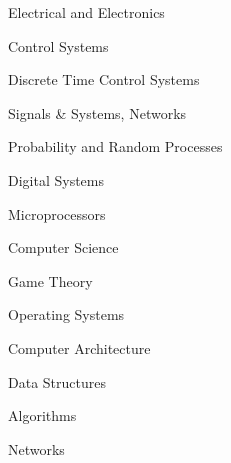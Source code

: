 \begin{courseentries}

  \courseentry
    {Electrical and Electronics} %
    {    
    \begin{cvitems} %
        \item {Control Systems}
        \item {Discrete Time Control Systems}
    \end{cvitems}
      }
    {    
    \begin{cvitems} %
        \item {Signals \& Systems, Networks}
        \item {Probability and Random Processes}
    \end{cvitems}
      }
    {    
    \begin{cvitems} %
        \item {Digital Systems}
        \item {Microprocessors}
    \end{cvitems}
      }
  \courseentry
    {Computer Science} %
    {    
    \begin{cvitems} %
        \item {Game Theory}
        \item {Operating Systems}
    \end{cvitems}
      }
    {    
    \begin{cvitems} %
        \item {Computer Architecture}
        \item {Data Structures}
    \end{cvitems}
      }
    {    
    \begin{cvitems} %
        \item {Algorithms}
        \item {Networks}

\end{cvitems}}
\end{courseentries}

